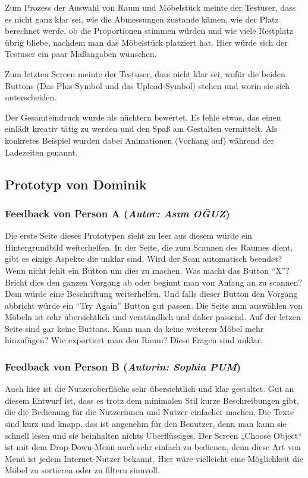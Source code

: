 \documentclass[12pt,paper=a4,oneside,hidelinks,headings=small,captions=heading,captions=nooneline]{scrartcl}
\begin{document}
Zum Prozess der Auswahl von Raum und Möbelstück meinte der Testuser,
dass es nicht ganz klar sei, wie die Abmessungen zustande kämen, wie
der Platz berechnet werde, ob die Proportionen stimmen würden und wie
viele Restplatz übrig bliebe, nachdem man das Möbelstück platziert
hat. Hier würde sich der Testuser ein paar Maßangaben wünschen.

Zum letzten Screen meinte der Testuser, dass nicht klar sei, wofür die
beiden Buttons (Das Plus-Symbol und das Upload-Symbol) stehen und
worin sie sich unterscheiden.

Der Gesamteindruck wurde als nüchtern bewertet. Es fehle etwas, das
einen einlädt kreativ tätig zu werden und den Spaß am Gestalten
vermittelt. Als konkretes Beispiel wurden dabei Animationen (Vorhang
auf) während der Ladezeiten genannt.

\subsection{Prototyp von Dominik}
\label{sec:org0f5a328}

\subsubsection{\textbf{Feedback von Person A} (\emph{Autor: Asım OĞUZ})}
\label{sec:org1541510}

Die erste Seite dieses Prototypen sieht zu leer aus diesem würde ein
Hintergrundbild weiterhelfen. In der Seite, die zum Scannen des Raumes
dient, gibt es einige Aspekte die unklar sind. Wird der Scan
automatisch beendet? Wenn nicht fehlt ein Button um dies zu
machen. Was macht das Button “X”? Bricht dies den ganzen Vorgang ab
oder beginnt man von Anfang an zu scannen? Dem würde eine Beschriftung
weiterhelfen. Und falls dieser Button den Vorgang abbricht würde ein
“Try Again” Button gut passen. Die Seite zum auswählen von Möbeln ist
sehr übersichtlich und verständlich und daher passend. Auf der letzen
Seite sind gar keine Buttons. Kann man da keine weiteren Möbel mehr
hinzufügen? Wie exportiert man den Raum? Diese Fragen sind unklar.

\subsubsection{\textbf{Feedback von Person B} (\emph{Autorin: Sophia PUM})}
\label{sec:org428ce8f}
Auch hier ist die Nutzeroberfläche sehr übersichtlich und klar gestaltet. Gut an diesem Entwurf ist, dass es trotz dem minimalen Stil kurze Beschreibungen gibt, die die Bedienung für die Nutzerinnen und Nutzer einfacher machen. Die Texte sind kurz und knapp, das ist angenehm für den Benutzer, denn man kann sie schnell lesen und sie beinhalten nichts Überflüssiges. Der Screen „Choose Object“ ist mit dem Drop-Down-Menü auch sehr einfach zu bedienen, denn diese Art von Menü ist jedem Internet-Nutzer bekannt. Hier wäre vielleicht eine Möglichkeit die Möbel zu sortieren oder zu filtern sinnvoll.
\end{document}
